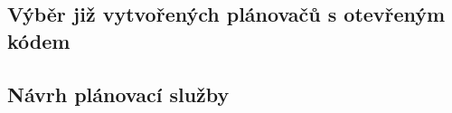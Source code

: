 \documentclass[thesis=M,czech]{FITthesis}[2019/12/23]
\theoremstyle{plain}
\theoremstyle{definition}
\begin{document}
\subsection{Výběr již vytvořených plánovačů s otevřeným kódem}


\subsection{Návrh plánovací služby}
\end{document}
